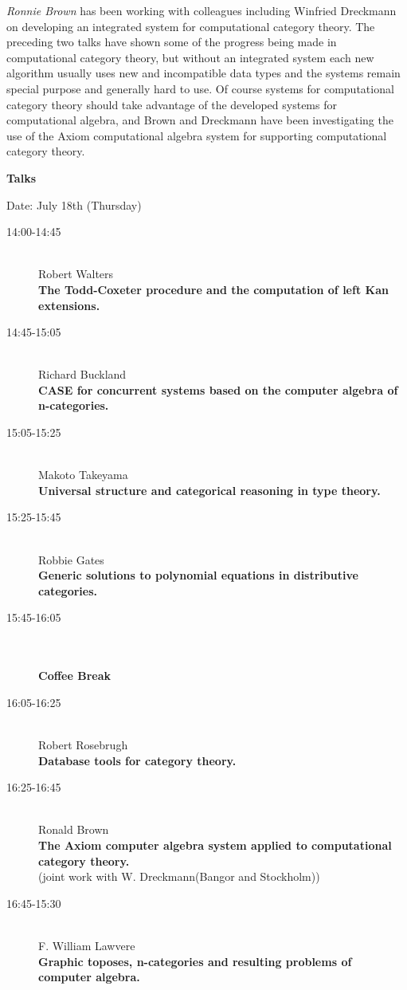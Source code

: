 {\em Ronnie Brown} has been working with colleagues including Winfried Dreckmann on developing an
integrated system for computational category theory. The preceding two talks have shown some of
the progress being made in computational category theory, but without an integrated system each
new algorithm usually uses new and incompatible data types and the systems remain special
purpose and generally hard to use. Of course systems for computational category theory should
take advantage of the developed systems for computational algebra, and Brown and Dreckmann
have been investigating the use of the Axiom computational algebra system for supporting
computational category theory. 

\bigskip
{\bf Talks}
\medskip

Date: July 18th (Thursday) 

\begin{description}
\item[14:00-14:45 ] \ \\
  Robert Walters
\\
  {\bf The Todd-Coxeter procedure and the computation of left Kan extensions.} 
\item[14:45-15:05 ] \ \\
  Richard Buckland
\\
  {\bf CASE for concurrent systems based on the computer algebra of n-categories.} 
\item[15:05-15:25] \ \\
  Makoto Takeyama
\\
  {\bf Universal structure and categorical reasoning in type theory.} 
\item[15:25-15:45] \ \\
  Robbie Gates\\
  {\bf Generic solutions to polynomial equations in distributive categories.} 
\item[15:45-16:05 ] \ \\
  \\
  {\bf Coffee Break } 
\item[16:05-16:25] \ \\
  Robert Rosebrugh\\
  {\bf Database tools for category theory.} 
\item[16:25-16:45] \ \\
  Ronald Brown\\
  {\bf The Axiom computer algebra system applied to computational
    category theory.} \\
(joint work with W. Dreckmann(Bangor and Stockholm)) 

\item[16:45-15:30] \ \\
  F. William Lawvere\\
  {\bf Graphic toposes, n-categories and resulting problems of
    computer algebra.} 
\end{description}

